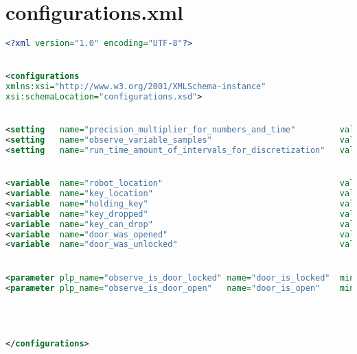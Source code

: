 \section{  configurations.xml}\label{Appendix_3_2} 
\begin{lstlisting}[style=stylexml,language=XML]
<?xml version="1.0" encoding="UTF-8"?>


<configurations
xmlns:xsi="http://www.w3.org/2001/XMLSchema-instance"
xsi:schemaLocation="configurations.xsd">


<setting   name="precision_multiplier_for_numbers_and_time"         value="100"/>
<setting   name="observe_variable_samples"                          value="10"/>
<setting   name="run_time_amount_of_intervals_for_discretization"   value="5"/>


<variable  name="robot_location"                                    value="at_a"        is_exclusive_access="true"  />
<variable  name="key_location"                                      value="at_a_key"    is_exclusive_access="true"  />
<variable  name="holding_key"                                       value="FALSE"       is_exclusive_access="true"  />
<variable  name="key_dropped"                                       value="FALSE"       is_exclusive_access="true"  />
<variable  name="key_can_drop"                                      value="FALSE"       is_exclusive_access="true"  />
<variable  name="door_was_opened"                                   value="FALSE"       is_exclusive_access="true"  />
<variable  name="door_was_unlocked"                                 value="FALSE"       is_exclusive_access="true"  />


<parameter plp_name="observe_is_door_locked" name="door_is_locked"  min_value="TRUE"   max_value="FALSE"  />
<parameter plp_name="observe_is_door_open"   name="door_is_open"    min_value="TRUE"   max_value="FALSE"  />




</configurations>
	\end{lstlisting}
